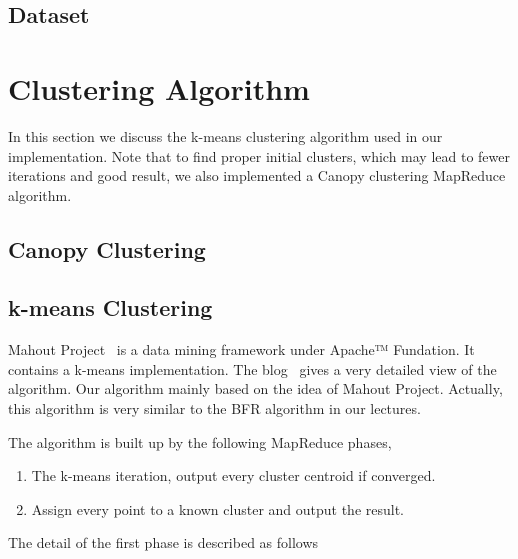 \documentclass[a4paper,11pt]{article}
\begin{document}
\subsection{Dataset}

\section{Clustering Algorithm}
In this section we discuss the k-means clustering algorithm used in our
implementation. Note that to find proper initial clusters, which may lead to
fewer iterations and good result, we also implemented a Canopy clustering
MapReduce algorithm.
\subsection{Canopy Clustering}
\subsection{k-means Clustering}
Mahout Project~\cite{apache:mahout} is a data mining framework under Apache™
Fundation. It contains a k-means implementation. The blog~\cite{algo:kmeans3}
gives a very detailed view of the algorithm. Our algorithm mainly based on the
idea of Mahout Project. Actually, this algorithm is very similar to the BFR
algorithm in our lectures.

The algorithm is built up by the following MapReduce phases,
\begin{enumerate}
  \item The k-means iteration, output every cluster centroid if
  converged.  	
  \item Assign every point to a known cluster and output the result.
\end{enumerate}

The detail of the first phase is described as follows
\end{document}
